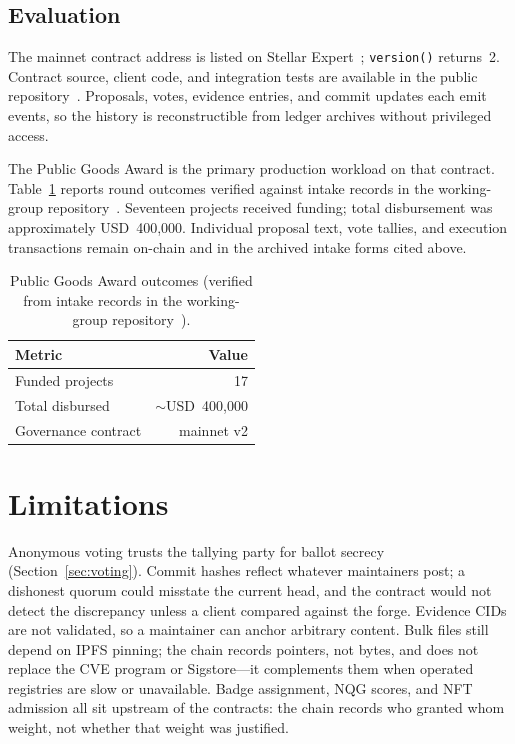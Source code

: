 \documentclass[11pt]{article}
\begin{document}
\subsection{Evaluation}
\label{sec:evaluation}

The mainnet contract address is listed on Stellar
Expert~\citep{stellar_expert_tansu}; \texttt{version()} returns~2. Contract
source, client code, and integration tests are available in the public
repository~\citep{tansu_repo}. Proposals, votes, evidence entries, and commit
updates each emit events, so the history is reconstructible from ledger
archives without privileged access.

The Public Goods Award is the primary production workload on that contract.
Table~\ref{tab:pg-award} reports round outcomes verified against intake records
in the working-group repository~\citep{pg_award_intake,pg_award_overview}.
Seventeen projects received funding; total disbursement was approximately
USD~400{,}000. Individual proposal text, vote tallies, and execution
transactions remain on-chain and in the archived intake forms cited above.

\begin{table}[t]
\centering
\caption{Public Goods Award outcomes (verified from intake records in the
working-group repository~\citep{pg_award_intake}).}
\label{tab:pg-award}
\begin{tabular}{lr}
\toprule
Metric & Value \\
\midrule
Funded projects & 17 \\
Total disbursed & ${\sim}$USD~400{,}000 \\
Governance contract & mainnet v2 \\
\bottomrule
\end{tabular}
\end{table}

\section{Limitations}
\label{sec:limitations}

Anonymous voting trusts the tallying party for ballot secrecy
(Section~\ref{sec:voting}). Commit hashes reflect whatever maintainers post; a
dishonest quorum could misstate the current head, and the contract would not
detect the discrepancy unless a client compared against the forge. Evidence CIDs
are not validated, so a maintainer can anchor arbitrary content. Bulk files
still depend on IPFS pinning; the chain records pointers, not bytes, and does
not replace the CVE program or Sigstore---it complements them when operated
registries are slow or unavailable. Badge assignment, NQG scores, and NFT
admission all sit upstream of the contracts: the chain records who granted whom
weight, not whether that weight was justified.
\end{document}
